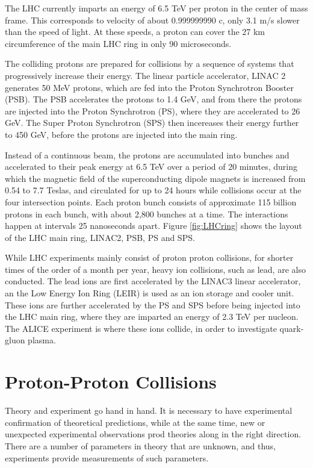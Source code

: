 \documentclass[11pt,a4paper,openright,twoside]{report}
\begin{document}
The LHC currently imparts an energy of 6.5 TeV per proton in the center of mass frame. This corresponds to velocity of about 0.999999990 c, only 3.1 m/s slower than the speed of light. At these speeds, a proton can cover the 27 km circumference of the main LHC ring in only 90 microseconds.

The colliding protons are prepared for collisions by a sequence of systems that progressively increase their energy. The linear particle accelerator, LINAC 2 generates 50 MeV protons, which are fed into the Proton Synchrotron Booster (PSB). The PSB accelerates the protons to 1.4 GeV, and from there the protons are injected into the Proton Synchrotron (PS), where they are accelerated to 26 GeV. The Super Proton Synchrotron (SPS) then incereases their energy further to 450 GeV, before the protons are injected into the main ring. 

Instead of a continuous beam, the protons are accumulated into bunches and accelerated to their peak energy at 6.5 TeV over a period of 20 minutes, during which the magnetic field of the superconducting dipole magnets is increased from 0.54 to 7.7 Teslas, and circulated for up to 24 hours while collisions occur at the four intersection points. Each proton bunch consists of approximate 115 billion protons in each bunch, with about 2,800 bunches at a time. The interactions happen at intervals 25 nanoseconds apart. Figure \ref{fig:LHCring} shows the layout of the LHC main ring, LINAC2, PSB, PS and SPS.

While LHC experiments mainly consist of proton proton collisions, for shorter times of the order of a month per year, heavy ion collisions, such as lead, are also conducted. The lead ions are first accelerated by the LINAC3 linear accelerator, an the Low Energy Ion Ring (LEIR) is used as an ion storage and cooler unit. These ions are further accelerated by the PS and SPS before being injected into the LHC main ring, where they are imparted an energy of 2.3 TeV per nucleon. The ALICE experiment is where these ions collide, in order to investigate quark-gluon plasma.

\section{Proton-Proton Collisions}
Theory and experiment go hand in hand. It is necessary to have experimental confirmation of theoretical predictions, while at the same time, new or unexpected experimental observations prod theories along in the right direction. There are a number of parameters in theory that are unknown, and thus, experiments provide measurements of such parameters. 
\end{document}
